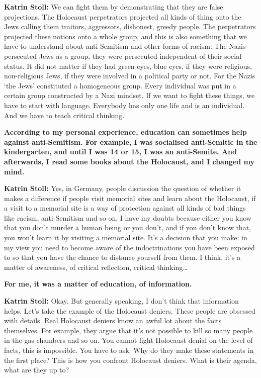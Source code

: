 \textbf{Katrin Stoll:} We can fight them by demonstrating that they are false projections. The Holocaust perpetrators projected all kinds of thing onto the Jews calling them traitors, aggressors, dishonest, greedy people. The perpetrators projected these notions onto a whole group, and this is also something that we have to understand about anti-Semitism and other forms of racism: The Nazis persecuted Jews as a group, they were persecuted independent of their social status. It did not matter if they had green eyes, blue eyes, if they were religious, non-religious Jews, if they were involved in a political party or not. For the Nazis ‘the Jews’ constituted a homogeneous group. Every individual was put in a certain group constructed by a Nazi mindset. If we want to fight these things, we have to start with language. Everybody has only one life and is an individual. And we have to teach critical thinking.   

\textbf{According to my personal experience, education can sometimes help against anti-Semitism. For example, I was socialised anti-Semitic in the kindergarten, and until I was 14 or 15, I was an anti-Semite. And afterwards, I read some books about the Holocaust, and I changed my mind.}

\textbf{Katrin Stoll:} Yes, in Germany, people discussion the question of whether it makes a difference if people visit memorial sites and learn about the Holocaust, if a visit to a memorial site is a way of protection against all kinds of bad things like racism, anti-Semitism and so on. I have my doubts because either you know that you don’t murder a human being or you don’t, and if you don’t know that, you won’t learn it by visiting a memorial site. It’s a decision that you make: in my view you need to become aware of the indoctrinations you have been exposed to so that you have the chance to distance yourself from them. I think, it’s a matter of awareness, of critical reflection, critical thinking… 

\textbf{For me, it was a matter of education, of information.} 

\textbf{Katrin Stoll:} Okay. But generally speaking, I don’t think that information helps. Let’s take the example of the Holocaust deniers.  These people are obsessed with details. Real Holocaust deniers know an awful lot about the facts themselves. For example, they argue that it’s not possible to kill so many people in the gas chambers and so on. You cannot fight Holocaust denial on the level of facts, this is impossible. You have to ask: Why do they make these statements in the first place? This is how you confront Holocaust deniers. What is their agenda, what are they up to? 


